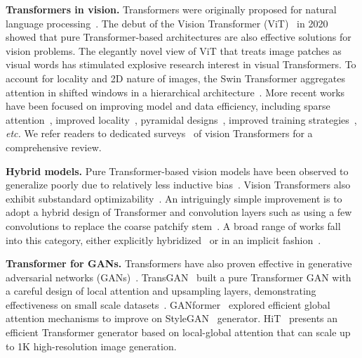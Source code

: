 \documentclass[runningheads]{llncs}
\def\etc{\emph{etc.} } \def\vs{\emph{vs.} }
\begin{document}
\noindent\textbf{Transformers in vision.}
Transformers were originally proposed for natural language processing~\cite{vaswani2017attention}. The debut of the Vision Transformer (ViT)~\cite{dosovitskiy2020image} in 2020 showed that pure Transformer-based architectures are also effective solutions for vision problems. The elegantly novel view of ViT that treats image patches as visual words has stimulated explosive research interest in visual Transformers. To account for locality and 2D nature of images, the Swin Transformer aggregates attention in shifted windows in a hierarchical architecture~\cite{liu2021swin}. More recent works have been focused on improving model and data efficiency, including sparse attention~\cite{dong2021cswin,yang2021focal,rao2021dynamicvit,wang2020axial, xu2022cobevt, arnab2021vivit}, improved locality~\cite{yuan2021tokens,han2021transformer}, pyramidal designs~\cite{wang2021pyramid,fan2021multiscale, xu2022v2x},
improved training strategies~\cite{touvron2021training,touvron2021going,zhou2021deepvit,bello2021revisiting}, \etc We refer readers to dedicated surveys~\cite{khan2021transformers,khan2021transformers} of vision Transformers for a comprehensive review.

\noindent\textbf{Hybrid models.}
Pure Transformer-based vision models have been observed to generalize poorly due to relatively less inductive bias~\cite{dosovitskiy2020image,dai2021coatnet,touvron2021training}. Vision Transformers also exhibit substandard optimizability~\cite{xiao2021early}. An intriguingly simple improvement is to adopt a hybrid design of Transformer and convolution layers such as using a few convolutions to replace the coarse patchify stem~\cite{xiao2021early,dai2021coatnet}. A broad range of works fall into this category, either explicitly hybridized~\cite{wu2021cvt,d2021convit,dai2021coatnet,xiao2021early,fan2021multiscale,xu2021co,bello2019attention} or in an implicit fashion~\cite{liu2021swin,chu2021twins}.

\noindent\textbf{Transformer for GANs.}
Transformers have also proven effective in generative adversarial networks (GANs)~\cite{goodfellow2014generative}. TransGAN~\cite{jiang2021transgan} built a pure Transformer GAN with a careful design of local attention and upsampling layers, demonstrating effectiveness on small scale datasets~\cite{krizhevsky2009learning,pmlr-v15-coates11a}. GANformer~\cite{hudson2021generative} explored efficient global attention mechanisms to improve on StyleGAN~\cite{karras2020analyzing} generator. HiT~\cite{zhao2021improved} presents an efficient Transformer generator based on local-global attention that can scale up to 1K high-resolution image generation.
\end{document}
